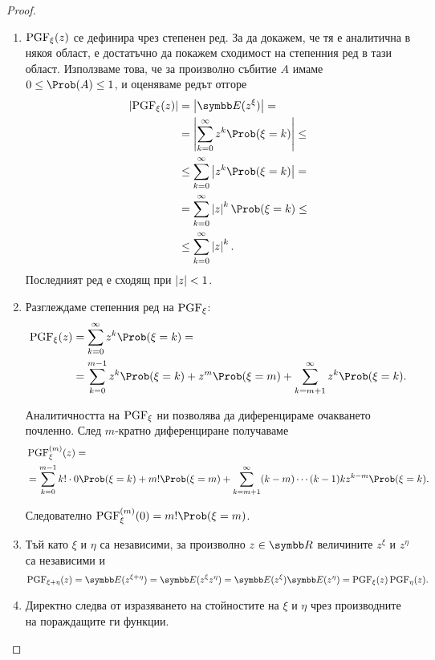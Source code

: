 \documentclass[numbers=endperiod, bibliography=totocnumbered]{scrartcl}
\begin{document}
\begin{proof}
  \mbox{}
  \begin{enumerate}
    \item \( \operatorname{PGF}_\xi(z) \) се дефинира чрез степенен ред. За да докажем, че тя е аналитична в някоя област, е достатъчно да покажем сходимост на степенния ред в тази област. Използваме това, че за произволно събитие \( A \) имаме \( 0 \leq \Prob(A) \leq 1 \), и оценяваме редът отгоре
    \begin{align*}
      \Abs{\PGF_\xi(z)}
      &=
      \Abs{\Expect(z^\xi)}
      = \\ &=
      \Abs{\sum_{k=0}^\infty z^k \Prob(\xi = k)}
      \leq \\ &\leq
      \sum_{k=0}^\infty \Abs{z^k \Prob(\xi = k)}
      = \\ &=
      \sum_{k=0}^\infty \Abs{z}^k \Prob(\xi = k)
      \leq \\ &\leq
      \sum_{k=0}^\infty \Abs{z}^k.
    \end{align*}
    Последният ред е сходящ при \( \left\vert z \right\vert < 1 \).

    \item Разглеждаме степенния ред на \( \operatorname{PGF}_\xi \):
    \begin{align*}
      \PGF_\xi(z)
      &=
      \sum_{k=0}^\infty z^k \Prob(\xi = k)
      = \\ &=
      \sum_{k=0}^{m-1} z^k \Prob(\xi = k) + z^m \Prob(\xi = m) + \sum_{k=m+1}^\infty z^k \Prob(\xi = k).
    \end{align*}

    Аналитичността на \( \operatorname{PGF}_\xi \) ни позволява да диференцираме очакването почленно. След \( m \)-кратно диференциране получаваме
    \begin{align*}
      &\PGF_\xi^{(m)}(z)
      = \\ &=
      \sum_{k=0}^{m-1} k! \cdot 0 \Prob(\xi = k) + m! \Prob(\xi = m) + \sum_{k=m+1}^\infty (k-m) \cdots (k-1) k z^{k-m} \Prob(\xi = k).
    \end{align*}

    Следователно \( \PGF_\xi^{(m)}(0) = m! \Prob(\xi = m) \).

    \item Тъй като \( \xi \) и \( \eta \) са независими, за произволно \( z \in \R \) величините \( z^\xi \) и \( z^\eta \) са независими и
    \begin{equation*}
      \PGF_{\xi + \eta}(z)
      =
      \Expect(z^{\xi + \eta})
      =
      \Expect(z^\xi z^\eta)
      =
      \Expect(z^\xi) \Expect(z^\eta)
      =
      \PGF_\xi(z) \PGF_\eta(z).
    \end{equation*}

    \item Директно следва от изразяването на стойностите на \( \xi \) и \( \eta \) чрез производните на пораждащите ги функции.
  \end{enumerate}
\end{proof}
\end{document}
